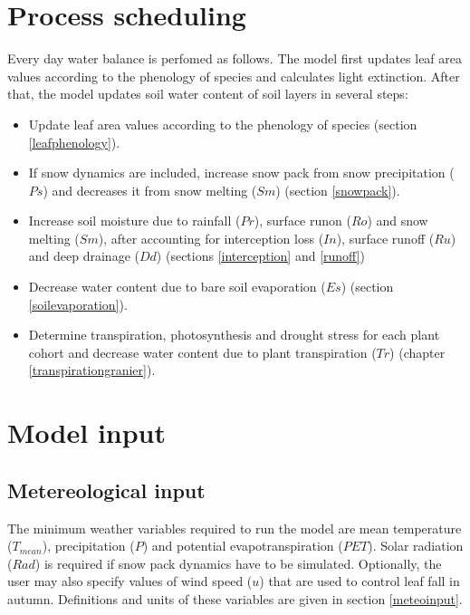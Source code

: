 \documentclass[]{book}
\providecommand{\tightlist}{%
  \setlength{\itemsep}{0pt}\setlength{\parskip}{0pt}}
\begin{document}
\hypertarget{process-scheduling}{%
\section{Process scheduling}\label{process-scheduling}}

Every day water balance is perfomed as follows. The model first updates leaf area values according to the phenology of species and calculates light extinction. After that, the model updates soil water content of soil layers in several steps:

\begin{itemize}
\tightlist
\item
  Update leaf area values according to the phenology of species (section \ref{leafphenology}).
\item
  If snow dynamics are included, increase snow pack from snow precipitation (\(Ps\)) and decreases it from snow melting (\(Sm\)) (section \ref{snowpack}).
\item
  Increase soil moisture due to rainfall (\(Pr\)), surface runon (\(Ro\)) and snow melting (\(Sm\)), after accounting for interception loss (\(In\)), surface runoff (\(Ru\)) and deep drainage (\(Dd\)) (sections \ref{interception} and \ref{runoff})
\item
  Decrease water content due to bare soil evaporation (\(Es\)) (section \ref{soilevaporation}).
\item
  Determine transpiration, photosynthesis and drought stress for each plant cohort and decrease water content due to plant transpiration (\(Tr\)) (chapter \ref{transpirationgranier}).
\end{itemize}

\hypertarget{model-input}{%
\section{Model input}\label{model-input}}

\hypertarget{metereological-input}{%
\subsection{Metereological input}\label{metereological-input}}

The minimum weather variables required to run the model are mean temperature (\(T_{mean}\)), precipitation (\(P\)) and potential evapotranspiration (\(PET\)). Solar radiation (\(Rad\)) is required if snow pack dynamics have to be simulated. Optionally, the user may also specify values of wind speed (\(u\)) that are used to control leaf fall in autumn. Definitions and units of these variables are given in section \ref{meteoinput}.
\end{document}
